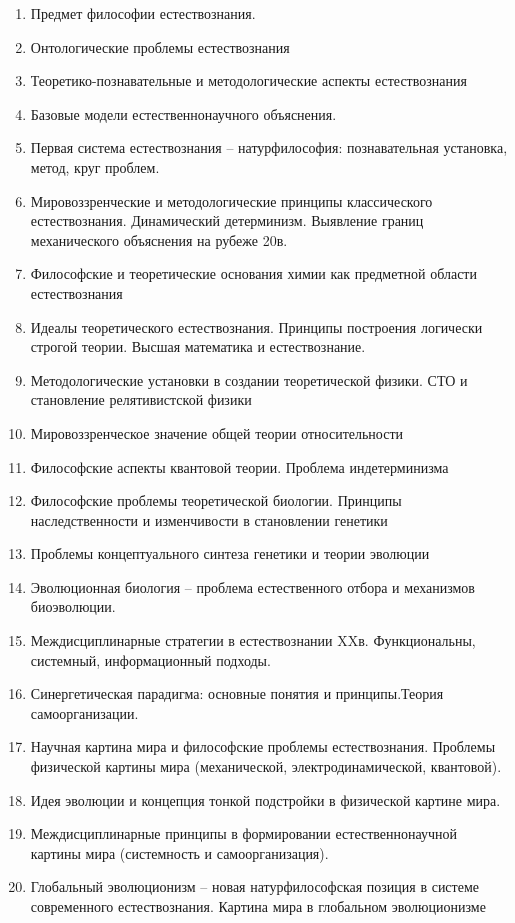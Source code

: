\documentclass[main.tex]{subfiles}
\begin{document}
\begin{enumerate}[nosep,leftmargin=*]
	\item Предмет философии естествознания.
	\item Онтологические проблемы естествознания
	\item Теоретико-познавательные и методологические аспекты естествознания
	\item Базовые модели естественнонаучного объяснения.
	\item Первая система естествознания -- натурфилософия: познавательная установка, метод, круг проблем.
	\item Мировоззренческие и методологические принципы классического естествознания. Динамический детерминизм. Выявление границ механического объяснения на рубеже 20в.
	\item Философские и теоретические основания химии как предметной области естествознания
	\item Идеалы теоретического естествознания. Принципы построения логически строгой теории. Высшая математика и естествознание.
	\item Методологические установки в создании теоретической физики. СТО и становление релятивистской физики
	\item Мировоззренческое значение общей теории относительности
	\item Философские аспекты квантовой теории. Проблема индетерминизма
	\item Философские проблемы теоретической биологии. Принципы наследственности и изменчивости в становлении генетики
	\item Проблемы концептуального синтеза генетики и теории эволюции
	\item Эволюционная биология -- проблема естественного отбора и механизмов биоэволюции.
	\item Междисциплинарные стратегии в естествознании XXв. Функциональны, системный, информационный подходы.
	\item Синергетическая парадигма: основные понятия и принципы.Теория самоорганизации.
	\item Научная картина мира и философские проблемы естествознания. Проблемы физической картины мира (механической, электродинамической, квантовой).
	\item Идея эволюции и концепция тонкой подстройки в физической картине мира.
	\item Междисциплинарные принципы в формировании естественнонаучной картины мира (системность и самоорганизация).
	\item Глобальный эволюционизм -- новая натурфилософская позиция в системе современного естествознания. Картина мира в глобальном эволюционизме
\end{enumerate}
\end{document}
